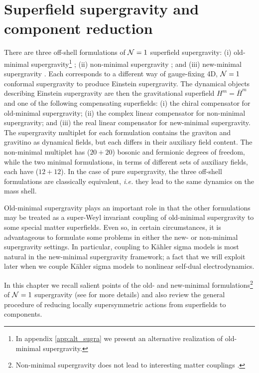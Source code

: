 \chapter{Superfield supergravity and component reduction}
\label{chap:sugra}

There are three off-shell formulations of ${\cal N}=1$ superfield supergravity: (i) old-minimal supergravity\footnote{In appendix \ref{app:alt_sugra} we present an alternative realization of old-minimal supergravity.} \cite{Ferrara:1978em,Grimm:1977kp,Stelle:1978ye,Wess:1977fn,Wess:1978bu}; (ii) non-minimal supergravity \cite{Breitenlohner:1977jn,Siegel:1978mj}; and (iii) new-minimal supergravity \cite{Akulov:1977bu,Sohnius:1981tp}. Each corresponds to a different way of gauge-fixing 4D, ${\cal N}=1$ conformal supergravity to produce Einstein supergravity. The dynamical objects describing Einstein supergravity are then the gravitational superfield $H^m={\bar H}^m$ and one of the following compensating superfields: (i) the chiral compensator for old-minimal supergravity; (ii) the complex linear compensator for non-minimal supergravity; and (iii) the real linear compensator for new-minimal supergravity. The supergravity multiplet for each formulation contains the graviton and gravitino as dynamical fields, but each differs in their auxiliary field content. The non-minimal multiplet has ($20+20$) bosonic and fermionic degrees of freedom, while the two minimal formulations, in terms of different sets of auxiliary fields, each have \mbox{($12+12$)}. In the case of pure supergravity, the three off-shell formulations are classically equivalent, {\it i.e.} they lead to the same dynamics on the mass shell. 

Old-minimal supergravity plays an important role in that the other formulations may be treated as a super-Weyl invariant coupling of old-minimal supergravity to some special matter superfields. Even so, in certain circumstances, it is advantageous to formulate some problems in either the new- or non-minimal supergravity settings. In particular, coupling to K{\"a}hler sigma models is most natural in the new-minimal supergravity framework; a fact that we will exploit later when we couple K{\"a}hler sigma models to nonlinear self-dual electrodynamics.

In this chapter we recall salient points of the old- and new-minimal formulations\footnote{Non-minimal supergravity does not lead to interesting matter couplings \cite{Buchbinder:1998qv}.} of ${\cal N}=1$ supergravity (see \cite{Gates:1983nr,Bagger:1990qh,Buchbinder:1998qv} for more details) and also review the general procedure of reducing locally supersymmetric actions from superfields to components.


